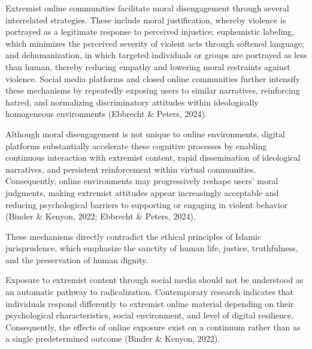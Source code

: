 \documentclass[10pt]{NSP1}
\begin{document}
Extremist online communities facilitate moral disengagement through several interrelated strategies. These include moral justification, whereby violence is portrayed as a legitimate response to perceived injustice; euphemistic labeling, which minimizes the perceived severity of violent acts through softened language; and dehumanization, in which targeted individuals or groups are portrayed as less than human, thereby reducing empathy and lowering moral restraints against violence. Social media platforms and closed online communities further intensify these mechanisms by repeatedly exposing users to similar narratives, reinforcing hatred, and normalizing discriminatory attitudes within ideologically homogeneous environments (Ebbrecht \& Peters, 2024).

Although moral disengagement is not unique to online environments, digital platforms substantially accelerate these cognitive processes by enabling continuous interaction with extremist content, rapid dissemination of ideological narratives, and persistent reinforcement within virtual communities. Consequently, online environments may progressively reshape users' moral judgments, making extremist attitudes appear increasingly acceptable and reducing psychological barriers to supporting or engaging in violent behavior (Binder \& Kenyon, 2022; Ebbrecht \& Peters, 2024).

These mechanisms directly contradict the ethical principles of Islamic jurisprudence, which emphasize the sanctity of human life, justice, truthfulness, and the preservation of human dignity.

\par\medskip{}\smallskip

Exposure to extremist content through social media should not be understood as an automatic pathway to radicalization. Contemporary research indicates that individuals respond differently to extremist online material depending on their psychological characteristics, social environment, and level of digital resilience. Consequently, the effects of online exposure exist on a continuum rather than as a single predetermined outcome (Binder \& Kenyon, 2022).
\end{document}
